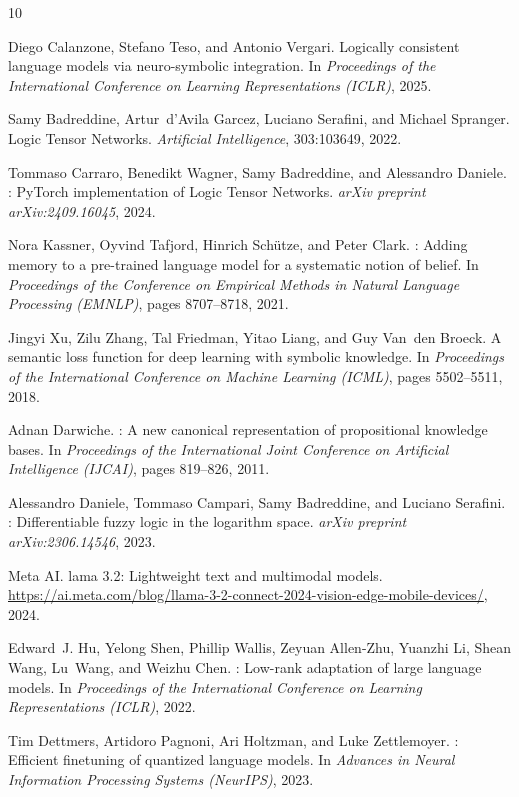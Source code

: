 \documentclass[11pt,a4paper]{article}
\begin{document}
\begin{thebibliography}{10}

Diego Calanzone, Stefano Teso, and Antonio Vergari.
\newblock Logically consistent language models via neuro-symbolic integration.
\newblock In \emph{Proceedings of the International Conference on Learning
  Representations (ICLR)}, 2025.

Samy Badreddine, Artur~d'Avila Garcez, Luciano Serafini, and Michael Spranger.
\newblock Logic {T}ensor {N}etworks.
\newblock \emph{Artificial Intelligence}, 303:103649, 2022.

Tommaso Carraro, Benedikt Wagner, Samy Badreddine, and Alessandro Daniele.
: {P}y{T}orch implementation of {L}ogic {T}ensor
  {N}etworks.
\newblock \emph{arXiv preprint arXiv:2409.16045}, 2024.

Nora Kassner, Oyvind Tafjord, Hinrich Sch\"{u}tze, and Peter Clark.
: Adding memory to a pre-trained language model for a
  systematic notion of belief.
\newblock In \emph{Proceedings of the Conference on Empirical Methods in
  Natural Language Processing (EMNLP)}, pages 8707--8718, 2021.

Jingyi Xu, Zilu Zhang, Tal Friedman, Yitao Liang, and Guy Van~den Broeck.
\newblock A semantic loss function for deep learning with symbolic knowledge.
\newblock In \emph{Proceedings of the International Conference on Machine
  Learning (ICML)}, pages 5502--5511, 2018.

Adnan Darwiche.
: A new canonical representation of propositional knowledge
  bases.
\newblock In \emph{Proceedings of the International Joint Conference on
  Artificial Intelligence (IJCAI)}, pages 819--826, 2011.

Alessandro Daniele, Tommaso Campari, Samy Badreddine, and Luciano Serafini.
: Differentiable fuzzy logic in the logarithm space.
\newblock \emph{arXiv preprint arXiv:2306.14546}, 2023.

Meta AI.
lama 3.2: Lightweight text and multimodal models.
\newblock \url{https://ai.meta.com/blog/llama-3-2-connect-2024-vision-edge-mobile-devices/}, 2024.

Edward~J. Hu, Yelong Shen, Phillip Wallis, Zeyuan Allen-Zhu, Yuanzhi Li,
  Shean Wang, Lu~Wang, and Weizhu Chen.
: Low-rank adaptation of large language models.
\newblock In \emph{Proceedings of the International Conference on Learning
  Representations (ICLR)}, 2022.

Tim Dettmers, Artidoro Pagnoni, Ari Holtzman, and Luke Zettlemoyer.
: Efficient finetuning of quantized language models.
\newblock In \emph{Advances in Neural Information Processing Systems
  (NeurIPS)}, 2023.

\end{thebibliography}
\end{document}
